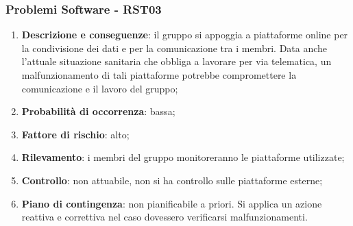 	\subsubsection{Problemi Software - RST03}
	\begin{enumerate}
		\item \textbf{Descrizione e conseguenze}: il gruppo si appoggia a piattaforme online per la condivisione dei dati e per la comunicazione tra i membri. Data anche l'attuale situazione sanitaria che obbliga a lavorare per via telematica, un malfunzionamento di tali piattaforme potrebbe compromettere la comunicazione e il lavoro del gruppo;
		\item \textbf{Probabilità di occorrenza}: bassa;
		\item \textbf{Fattore di rischio}: alto;
		\item \textbf{Rilevamento}: i membri del gruppo monitoreranno le piattaforme utilizzate;
		\item \textbf{Controllo}: non attuabile, non si ha controllo sulle piattaforme esterne; 
		\item \textbf{Piano di contingenza}: non pianificabile a priori. Si applica un azione reattiva e correttiva nel caso dovessero verificarsi malfunzionamenti.
	\end{enumerate}		
